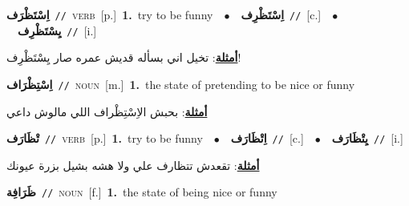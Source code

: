 \documentclass[10pt,a4paper,twoside]{article} %
\begin{document}
\begin{multicols}{2}
{\setlength\topsep{0pt}\textbf{\foreignlanguage{arabic}{اِسْتَظْرَف}}\ {\color{gray}\texttt{//}\color{black}}\ \textsc{verb}\ [p.]\ \textbf{1.}~try to be funny\ \ $\bullet$\ \ \setlength\topsep{0pt}\textbf{\foreignlanguage{arabic}{اِسْتَظْرِف}}\ {\color{gray}\texttt{//}\color{black}}\ [c.]\ \ $\bullet$\ \ \setlength\topsep{0pt}\textbf{\foreignlanguage{arabic}{يِسْتَظْرِف}}\ {\color{gray}\texttt{//}\color{black}}\ [i.]\  \begin{flushright}\color{gray}\foreignlanguage{arabic}{\textbf{\underline{\foreignlanguage{arabic}{أمثلة}}}: تخيل اني بسأله قديش عمره صار يِسْتَظْرِف!}\end{flushright}\color{black}} \vspace{2mm}

{\setlength\topsep{0pt}\textbf{\foreignlanguage{arabic}{اِسْتِظْرَاف}}\ {\color{gray}\texttt{//}\color{black}}\ \textsc{noun}\ [m.]\ \textbf{1.}~the state of pretending to be nice or funny\  \begin{flushright}\color{gray}\foreignlanguage{arabic}{\textbf{\underline{\foreignlanguage{arabic}{أمثلة}}}: بحبش الاِسْتِظْراف اللي مالوش داعي}\end{flushright}\color{black}} \vspace{2mm}

{\setlength\topsep{0pt}\textbf{\foreignlanguage{arabic}{تْظَارَف}}\ {\color{gray}\texttt{//}\color{black}}\ \textsc{verb}\ [p.]\ \textbf{1.}~try to be funny\ \ $\bullet$\ \ \setlength\topsep{0pt}\textbf{\foreignlanguage{arabic}{اِتْظَارَف}}\ {\color{gray}\texttt{//}\color{black}}\ [c.]\ \ $\bullet$\ \ \setlength\topsep{0pt}\textbf{\foreignlanguage{arabic}{يِتْظَارَف}}\ {\color{gray}\texttt{//}\color{black}}\ [i.]\  \begin{flushright}\color{gray}\foreignlanguage{arabic}{\textbf{\underline{\foreignlanguage{arabic}{أمثلة}}}: تقعدش تتظارف علي ولا هشه بشيل بزرة عيونك}\end{flushright}\color{black}} \vspace{2mm}

{\setlength\topsep{0pt}\textbf{\foreignlanguage{arabic}{ظَرَافِة}}\ {\color{gray}\texttt{//}\color{black}}\ \textsc{noun}\ [f.]\ \textbf{1.}~the state of being nice or funny\ } \vspace{2mm}


\end{multicols}
\end{document}
